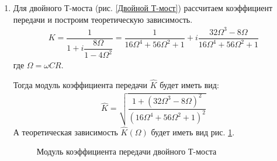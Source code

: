 \documentclass[a4paper, usenames, dvipsnames]{article}
\begin{document}
\begin{enumerate}
    \item Для двойного Т-моста (рис. \ref{Двойной Т-мост}) рассчитаем коэффициент передачи и построим теоретическую зависимость.
          \begin{gather*}
              K = \dfrac{1}{1 + i\dfrac{8 \Omega}{1 - 4\Omega^2}} = \dfrac{1}{16\Omega^4 + 56\Omega^2 + 1} + i\dfrac{32\Omega^3 - 8\Omega}{16\Omega^4 + 56\Omega^2 + 1}
          \end{gather*}
          где $\Omega = \omega CR$.

          Тогда модуль коэффициента передачи $\hat{K}$ будет иметь вид:
          \begin{gather*}
              \hat{K} = \sqrt{\dfrac{1 + \left(32\Omega^3 - 8\Omega\right)^2}{\left(16\Omega^4 + 56\Omega^2 + 1\right)^2}}
          \end{gather*}
          А теоретическая зависимость $\hat{K}(\Omega)$ будет иметь вид рис. \ref{Модуль коэффициента передачи двойного Т-моста}.
          \begin{figure}[h]
              \centering
              \caption{Модуль коэффициента передачи двойного Т-моста}
              \label{Модуль коэффициента передачи двойного Т-моста}
          \end{figure}
\end{enumerate}
\end{document}
